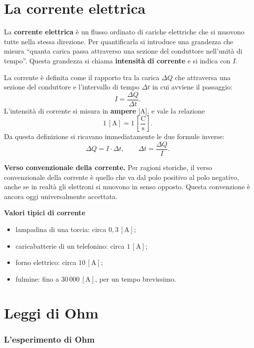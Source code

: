 \section{La corrente elettrica}


La \textbf{corrente elettrica} è un flusso ordinato di cariche elettriche che si muovono tutte nella stessa direzione. Per quantificarla si introduce una grandezza che misura ``quanta carica passa attraverso una sezione del conduttore nell'unità di tempo''. Questa grandezza si chiama \textbf{intensità di corrente} e si indica con \(I\).

La corrente è definita come il rapporto tra la carica \(\Delta Q\) che attraversa una sezione del conduttore e l'intervallo di tempo \(\Delta t\) in cui avviene il passaggio:
\[
I = \frac{\Delta Q}{\Delta t}.
\]
L'intensità di corrente si misura in \textbf{ampere} [\(\text{A}\)], e vale la relazione
\[
1\,[\text{A}] = 1\,\left[\frac{\text{C}}{\text{s}}\right].
\]
Da questa definizione si ricavano immediatamente le due formule inverse:
\[
\Delta Q = I \cdot \Delta t, \qquad \Delta t = \frac{\Delta Q}{I}.
\]

\begin{concetto}
\textbf{Verso convenzionale della corrente.} Per ragioni storiche, il verso convenzionale della corrente è quello che va dal polo positivo al polo negativo, anche se in realtà gli elettroni si muovono in senso opposto. Questa convenzione è ancora oggi universalmente accettata.
\end{concetto}

\begin{esempio}
\textbf{Valori tipici di corrente}
\begin{itemize}[leftmargin=1cm]
  \item lampadina di una torcia: circa \(0{,}3\,[\text{A}]\);
  \item caricabatterie di un telefonino: circa \(1\,[\text{A}]\);
  \item forno elettrico: circa \(10\,[\text{A}]\);
  \item fulmine: fino a \(30\,000\,[\text{A}]\), per un tempo brevissimo.
\end{itemize}
\end{esempio}

\section{Leggi di Ohm}


\subsubsection{L'esperimento di Ohm}

